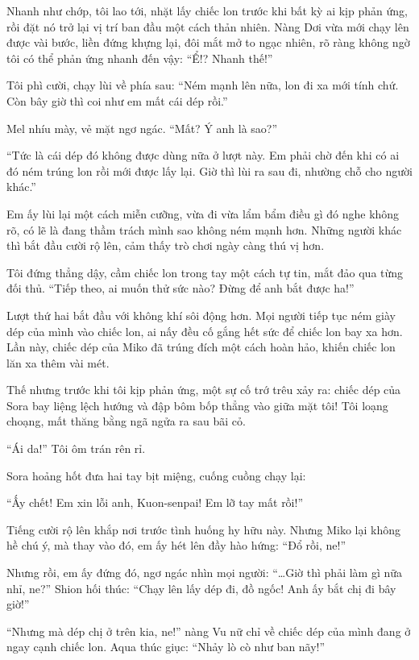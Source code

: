 \documentclass[../main.tex]{subfiles}
\begin{document}
Nhanh như chớp, tôi lao tới, nhặt lấy chiếc lon trước khi bất kỳ ai kịp phản ứng, rồi đặt nó trở lại vị trí ban đầu một cách thản nhiên. Nàng Dơi vừa mới chạy lên được vài bước, liền đứng khựng lại, đôi mắt mở to ngạc nhiên, rõ ràng không ngờ tôi có thể phản ứng nhanh đến vậy: ``Ể!? Nhanh thế!''

Tôi phì cười, chạy lùi về phía sau: ``Ném mạnh lên nữa, lon đi xa mới tính chứ. Còn bây giờ thì coi như em mất cái dép rồi.''

Mel nhíu mày, vẻ mặt ngơ ngác. ``Mất? Ý anh là sao?''

``Tức là cái dép đó không được dùng nữa ở lượt này. Em phải chờ đến khi có ai đó ném trúng lon rồi mới được lấy lại. Giờ thì lùi ra sau đi, nhường chỗ cho người khác.''

Em ấy lùi lại một cách miễn cưỡng, vừa đi vừa lẩm bẩm điều gì đó nghe không rõ, có lẽ là đang thầm trách mình sao không ném mạnh hơn. Những người khác thì bắt đầu cười rộ lên, cảm thấy trò chơi ngày càng thú vị hơn.

Tôi đứng thẳng dậy, cầm chiếc lon trong tay một cách tự tin, mắt đảo qua từng đối thủ. ``Tiếp theo, ai muốn thử sức nào? Đừng để anh bắt được ha!''

\ct

Lượt thứ hai bắt đầu với không khí sôi động hơn. Mọi người tiếp tục ném giày dép của mình vào chiếc lon, ai nấy đều cố gắng hết sức để chiếc lon bay xa hơn. Lần này, chiếc dép của Miko đã trúng đích một cách hoàn hảo, khiến chiếc lon lăn xa thêm vài mét.

Thế nhưng trước khi tôi kịp phản ứng, một sự cố trớ trêu xảy ra: chiếc dép của Sora bay liệng lệch hướng và đập bôm bốp thẳng vào giữa mặt tôi! Tôi loạng choạng, mất thăng bằng ngã ngửa ra sau bãi cỏ.

``Ái da!'' Tôi ôm trán rên rỉ.

Sora hoảng hốt đưa hai tay bịt miệng, cuống cuồng chạy lại:

``Ấy chết! Em xin lỗi anh, Kuon-senpai! Em lỡ tay mất rồi!''

Tiếng cười rộ lên khắp nơi trước tình huống hy hữu này. Nhưng Miko lại không hề chú ý, mà thay vào đó, em ấy hét lên đầy hào hứng: ``Đổ rồi, ne!''

Nhưng rồi, em ấy đứng đó, ngơ ngác nhìn mọi người: ``\dots Giờ thì phải làm gì nữa nhỉ, ne?'' Shion hối thúc: ``Chạy lên lấy dép đi, đồ ngốc! Anh ấy bắt chị đi bây giờ!''

``Nhưng mà dép chị ở trên kia, ne!'' nàng Vu nữ chỉ về chiếc dép của mình đang ở ngay cạnh chiếc lon. Aqua thúc giục: ``Nhảy lò cò như ban nãy!''
\end{document}
